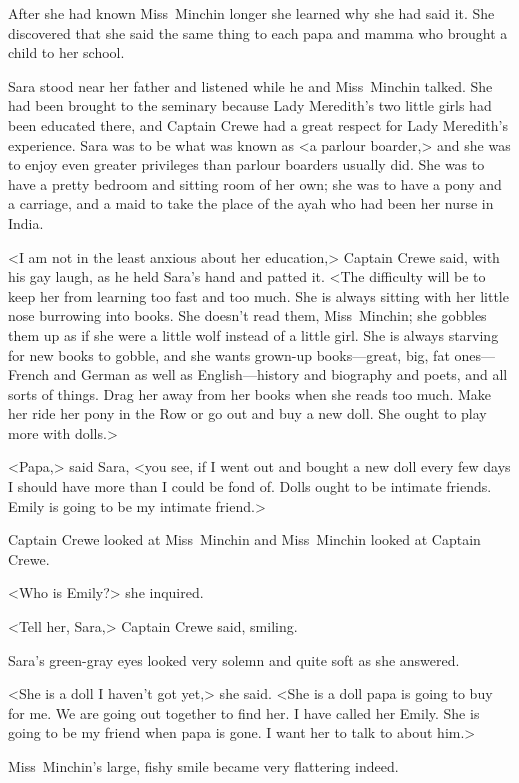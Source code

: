 After she had known Miss~Minchin longer she learned why she had said it. She discovered that she said the same thing to each papa and mamma who brought a child to her school.

Sara stood near her father and listened while he and Miss~Minchin talked. She had been brought to the seminary because Lady Meredith's two little girls had been educated there, and Captain Crewe had a great respect for Lady Meredith's experience. Sara was to be what was known as <a parlour boarder,> and she was to enjoy even greater privileges than parlour boarders usually did. She was to have a pretty bedroom and sitting room of her own; she was to have a pony and a carriage, and a maid to take the place of the ayah who had been her nurse in India.

<I am not in the least anxious about her education,> Captain Crewe said, with his gay laugh, as he held Sara's hand and patted it. <The difficulty will be to keep her from learning too fast and too much. She is always sitting with her little nose burrowing into books. She doesn't read them, Miss~Minchin; she gobbles them up as if she were a little wolf instead of a little girl. She is always starving for new books to gobble, and she wants grown-up books—great, big, fat ones—French and German as well as English—history and biography and poets, and all sorts of things. Drag her away from her books when she reads too much. Make her ride her pony in the Row or go out and buy a new doll. She ought to play more with dolls.>

<Papa,> said Sara, <you see, if I went out and bought a new doll every few days I should have more than I could be fond of. Dolls ought to be intimate friends. Emily is going to be my intimate friend.>

Captain Crewe looked at Miss~Minchin and Miss~Minchin looked at Captain Crewe.

<Who is Emily?> she inquired.

<Tell her, Sara,> Captain Crewe said, smiling.

Sara's green-gray eyes looked very solemn and quite soft as she answered.

<She is a doll I haven't got yet,> she said. <She is a doll papa is going to buy for me. We are going out together to find her. I have called her Emily. She is going to be my friend when papa is gone. I want her to talk to about him.>

Miss~Minchin's large, fishy smile became very flattering indeed.

